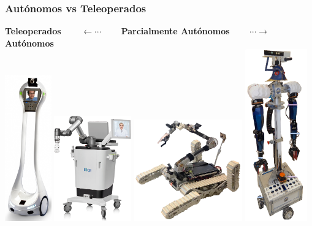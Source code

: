 \documentclass[10pt,spanish,aspectratio=1610]{beamer}
\begin{document}
\begin{frame}\frametitle{Autónomos vs Teleoperados}
  \centering
  \textbf{Teleoperados} $\qquad\leftarrow \cdots\qquad$ \textbf{Parcialmente Autónomos}  $\qquad\cdots\rightarrow\qquad$ \textbf{Autónomos}\\
  \includegraphics[width=0.15\textwidth]{Figures/TelepresenceRobot.png}
  \includegraphics[width=0.25\textwidth]{Figures/UltraSoundRobot.png}
  \includegraphics[width=0.35\textwidth]{Figures/RescueRobot.png}
  \includegraphics[width=0.2\textwidth]{Figures/Justina.png}
\end{frame}
  
\end{document}
